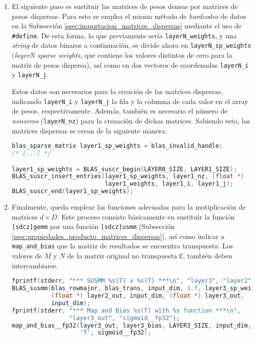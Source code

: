 \begin{enumerate}
\begin{lstlisting}[language=C]
    case 'T':
    case 't':
        for (uint32_t i = 0; i < M; i++){
            for(uint32_t j = 0; j < N; j++){
                A[i*N+j].val = map_function((fp32)(A[i*N+j].val 
                                            + bias[i].val)).val;
            }                                 // ^^^^^
        }                    // aquí se cambia el orden de acceso a bias
        break;
    }
}
\end{lstlisting}

    \item El siguiente paso es sustituir las matrices de pesos densas por matrices de pesos dispersas. Para esto se emplea el mismo método de \textit{hardcodeo} de datos en la Subsección \ref{ssec:importacion_matrices_dispersas} mediante el uso de \texttt{\#define}. De esta forma, lo que previamente sería \texttt{layerN\_weights}, y una \textit{string} de datos binaros a continuación, se divide ahora en \texttt{layerN\_sp\_weights} (\textit{layerN sparse weights}, que contiene los valores distintos de cero para la matriz de pesos dispersa), así como en dos vectores de coordenadas \texttt{layerN\_i} y \texttt{layerN\_j}.
    
    Estos datos son necesarios para la creación de las matrices dispersas, indicando \texttt{layerN\_i} y \texttt{layerN\_j} la fila y la columna de cada valor en el array de pesos, respectivamente. Además, también es necesario el número de \textit{nonzeros} (\texttt{layerN\_nz}) para la creaación de dichas matrices. Sabiendo esto, las matrices dispersas se crean de la siguiente manera:
\begin{lstlisting}[language=C]
blas_sparse_matrix layer1_sp_weights = blas_invalid_handle;
/* [...] */

layer1_sp_weights = BLAS_suscr_begin(LAYER0_SIZE, LAYER1_SIZE);
BLAS_suscr_insert_entries(layer1_sp_weights, layer1_nz, (float *)
                          layer1_weights, layer1_i, layer1_j);
BLAS_suscr_end(layer1_sp_weights);
\end{lstlisting}

    \item Finalmente, queda emplear las funciones adecuadas para la mutiplicación de matrices $d\times D$. Este proceso consiste básicamente en sustituir la función \texttt{[sdcz]gemm} por una función \texttt{[sdcz]usmm} (Subsección \ref{ssec:propiedades_producto_matrices_dispersas}), así como indicar a \texttt{map\_and\_bias} que la matriz de resultados se encuentra transpuesta. Los valores de $M$ y $N$ de la matriz original no transpuesta \texttt{C}, también deben intercambiarse.
\begin{lstlisting}[language=C]
fprintf(stderr, "*** SUSMM %s(T) x %s(T) ***\n", "layer3", "layer2");
BLAS_susmm(blas_rowmajor, blas_trans, input_dim, 1.f, layer3_sp_weights,
           (float *) layer2_out, input_dim, (float *) layer3_out,
           input_dim);
fprintf(stderr, "*** Map and Bias %s(T) with %s function ***\n",
                "layer3_out", "sigmoid__fp32");
map_and_bias__fp32(layer3_out, layer3_bias, LAYER3_SIZE, input_dim,
                   'T', sigmoid__fp32);
\end{lstlisting}
\end{enumerate}

